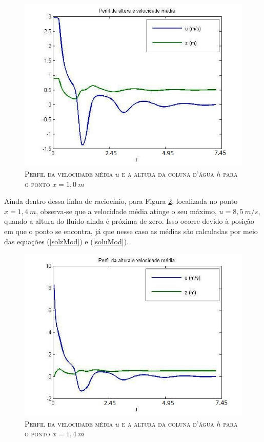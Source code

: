  \begin{figure}[H]
 	\centering
 	\includegraphics[scale=1]{figuras/perfil10s.jpg}
 	\caption{\textsc{Perfil da velocidade média $u$ e a altura da coluna d'água $h$ para o ponto $x=1,0 \ m$}}
 	\vspace{-0.1cm}
 	\label{perfil0s}
 \end{figure}
 
 Ainda dentro dessa linha de raciocínio, para Figura \ref{perfil4s}, localizada no ponto $x= 1,4 \ m$, observa-se que a velocidade média atinge o seu máximo, $u=8,5 \ m/s$, quando a altura do fluido ainda é próxima de zero. Isso ocorre devido à posição em que o ponto se encontra, já que nesse caso as médias são calculadas por meio das equações (\ref{solzMod}) e (\ref{soluMod}).
 
 \begin{figure}[H]
 	\centering
 	\includegraphics[scale=1]{figuras/perfil14s.jpg}
 	\caption{\textsc{Perfil da velocidade média $u$ e a altura da coluna d'água $h$ para o ponto $x=1,4 \ m$}}
 	\vspace{-0.1cm}
 	\label{perfil4s}
 \end{figure}
 
